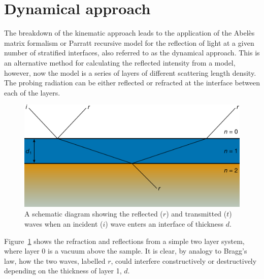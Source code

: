 \documentclass[
 reprint,
 superscriptaddress,
 amsmath,amssymb,
 aps,
]{revtex4-1}
\begin{document}
\section{Dynamical approach}
The breakdown of the kinematic approach leads to the application of the Abel\`{e}s matrix formalism \cite{abeles_sur_1948} or Parratt \cite{parratt_surface_1954} recursive model for the reflection of light at a given number of stratified interfaces, also referred to as the dynamical approach.
This is an alternative method for calculating the reflected intensity from a model, however, now the model is a series of layers of different scattering length density.
The probing radiation can be either reflected or refracted at the interface between each of the layers.
%
\begin{figure}[t]
    \includegraphics[width=\linewidth]{dynamic}
    \caption{A schematic diagram showing the reflected ($r$) and transmitted ($t$) waves when an incident ($i$) wave enters an interface of thickness $d$.}
    \label{fig:refr}
\end{figure}
%
Figure~\ref{fig:refr} shows the refraction and reflections from a simple two layer system, where layer \num{0} is a vacuum above the sample.
It is clear, by analogy to Bragg's law, how the two waves, labelled $r$, could interfere constructively or destructively depending on the thickness of layer \num{1}, $d$.
\end{document}
